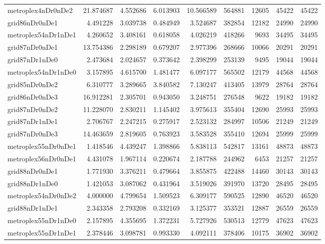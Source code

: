\documentclass[../../../thesis.tex]{subfiles}
\begin{document}
\begin{longtable}{|l|r|r|r|r|r|r|r|r|}
metroplex4nDr0nDe2 & 21.874687 & 4.552686 & 6.013903 & 10.566589 & 564881 & 12605 & 45422 & 45422 \\
grid86nDr0nDe1 & 4.491228 & 3.039738 & 0.484949 & 3.524687 & 382854 & 12182 & 24990 & 24990 \\
metroplex54nDr1nDe1 & 4.260652 & 3.408161 & 0.618058 & 4.026219 & 418266 & 9693 & 34495 & 34495 \\
grid87nDr0nDe1 & 13.754386 & 2.298189 & 0.679207 & 2.977396 & 268666 & 10066 & 20291 & 20291 \\
grid87nDr1nDe0 & 2.473684 & 2.024657 & 0.373642 & 2.398299 & 253139 & 9495 & 19044 & 19044 \\
metroplex54nDr1nDe0 & 3.157895 & 4.615700 & 1.481477 & 6.097177 & 565502 & 12179 & 44568 & 44568 \\
grid85nDr0nDe2 & 6.310777 & 3.289665 & 3.840582 & 7.130247 & 413405 & 13979 & 28764 & 28764 \\
grid86nDr0nDe3 & 16.912281 & 2.305701 & 0.943050 & 3.248751 & 276548 & 9622 & 19182 & 19182 \\
grid87nDr0nDe2 & 11.228070 & 2.830211 & 1.145402 & 3.975613 & 355404 & 12690 & 25993 & 25993 \\
grid87nDr1nDe1 & 2.706767 & 2.247215 & 0.275917 & 2.523132 & 284997 & 10506 & 21249 & 21249 \\
grid87nDr0nDe3 & 14.463659 & 2.819605 & 0.763923 & 3.583528 & 355410 & 12694 & 25999 & 25999 \\
metroplex55nDr0nDe1 & 1.418546 & 4.439247 & 1.398866 & 5.838113 & 542817 & 13161 & 48873 & 48873 \\
metroplex56nDr0nDe1 & 4.431078 & 1.967114 & 0.220674 & 2.187788 & 244962 & 6453 & 21257 & 21257 \\
grid88nDr0nDe1 & 1.771930 & 3.376211 & 0.479664 & 3.855875 & 422488 & 14460 & 30143 & 30143 \\
grid88nDr1nDe0 & 1.421053 & 3.087062 & 0.431964 & 3.519026 & 391970 & 13720 & 28495 & 28495 \\
metroplex54nDr0nDe2 & 4.000000 & 4.799654 & 1.509523 & 6.309177 & 590525 & 12890 & 46520 & 46520 \\
grid88nDr1nDe1 & 2.343358 & 2.793208 & 0.332169 & 3.125377 & 353521 & 12887 & 26559 & 26559 \\
metroplex55nDr1nDe0 & 2.157895 & 4.355695 & 1.372231 & 5.727926 & 530513 & 12779 & 47623 & 47623 \\
metroplex55nDr1nDe1 & 2.378446 & 3.098781 & 0.993330 & 4.092111 & 378406 & 10175 & 36902 & 36902 \\

\end{longtable}
\end{document}

